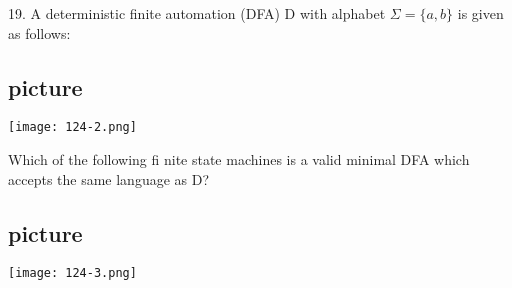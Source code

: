 \documentclass{article}
\begin{document}
19. A deterministic finite automation (DFA) D with alphabet $\Sigma = \{a, b\}$ is given as follows:\\

\begin{center}
\section{picture}
\texttt{[image: 124-2.png]}
\end{center}

\vspace*{0.2cm}
\hspace*{0.5cm} Which of the following fi nite state machines is a valid minimal DFA which accepts the same
language as D?\\

\begin{center}
\section{picture}
\texttt{[image: 124-3.png]}
\end{center}
\end{document}
